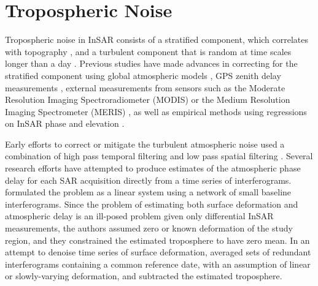 \documentclass{utexasthesis}
\begin{document}
\section{Tropospheric Noise}


Tropospheric noise in InSAR consists of a stratified component, which correlates with topography \cite{Doin2009CorrectionsStratifiedTropospheric}, and a turbulent component that is random at time scales longer than a day \cite{Emardson2003NeutralAtmosphericDelay, Onn2006ModelingWaterVapor}. Previous studies have made advances in correcting for the stratified component using global atmospheric models \cite{Doin2009CorrectionsStratifiedTropospheric, Jolivet2014ImprovingInsarGeodesy, Cao2021AdvancedInsarTropospheric}, GPS zenith delay measurements \cite{Onn2006ModelingWaterVapor}, external measurements from sensors such as the Moderate Resolution Imaging Spectroradiometer (MODIS) \cite{Li2005InterferometricSyntheticAperture, Barnhart2013CharacterizingEstimatingNoise} or the Medium Resolution Imaging Spectrometer (MERIS)  \cite{Ding2008AtmosphericEffectsInsar}, as well as empirical methods using regressions on InSAR phase and elevation \cite{Zebker2021AccuracyModelFree, Murray2021ClusterBasedEmpirical}.

Early efforts to correct or mitigate the turbulent atmospheric noise used a combination of high pass temporal filtering and low pass spatial filtering \cite{Ferretti2001PermanentScatterersSar, Berardino2002NewAlgorithmSurface}.
Several research efforts have attempted to produce estimates of the atmospheric phase delay for each SAR acquisition directly from a time series of interferograms. \cite{Liu2012SatelliteRadarInterferometry} formulated the problem as a linear system using a network of small baseline interferograms. Since the problem of estimating both surface deformation and atmospheric delay is an ill-posed problem given only differential InSAR measurements, the authors assumed zero or known deformation of the study region, and they constrained the estimated troposphere to have zero mean. In an attempt to denoise time series of surface deformation, \cite{Tymofyeyeva2015MitigationAtmosphericPhase} averaged sets of redundant interferograms containing a common reference date, with an assumption of linear or slowly-varying deformation, and subtracted the estimated troposphere.
\end{document}
